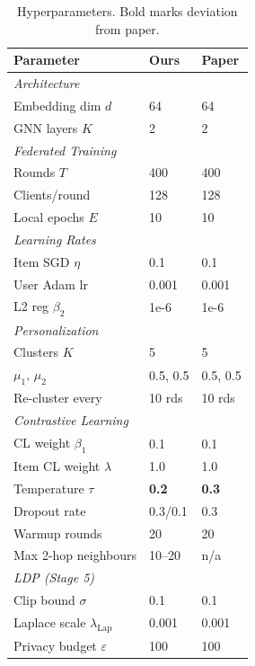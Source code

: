 \documentclass[10pt,twocolumn]{article}
\begin{document}
\begin{table}[H]
\centering
\caption{Hyperparameters. Bold marks deviation from paper.}
\label{tab:hparams}
\setlength{\tabcolsep}{4pt}
\footnotesize
\begin{tabular}{lll}
\toprule
\textbf{Parameter} & \textbf{Ours} & \textbf{Paper} \\
\midrule
\multicolumn{3}{l}{\textit{Architecture}} \\
Embedding dim $d$  & 64    & 64 \\
GNN layers $K$     & 2     & 2 \\
\midrule
\multicolumn{3}{l}{\textit{Federated Training}} \\
Rounds $T$         & 400   & 400 \\
Clients/round      & 128   & 128 \\
Local epochs $E$   & 10    & 10 \\
\midrule
\multicolumn{3}{l}{\textit{Learning Rates}} \\
Item SGD $\eta$    & 0.1   & 0.1 \\
User Adam lr       & 0.001 & 0.001 \\
L2 reg $\beta_2$   & 1e-6  & 1e-6 \\
\midrule
\multicolumn{3}{l}{\textit{Personalization}} \\
Clusters $K$       & 5     & 5 \\
$\mu_1,\,\mu_2$    & 0.5, 0.5 & 0.5, 0.5 \\
Re-cluster every   & 10 rds & 10 rds \\
\midrule
\multicolumn{3}{l}{\textit{Contrastive Learning}} \\
CL weight $\beta_1$        & 0.1  & 0.1 \\
Item CL weight $\lambda$   & 1.0  & 1.0 \\
Temperature $\tau$         & \textbf{0.2} & \textbf{0.3} \\
Dropout rate               & 0.3/0.1 & 0.3 \\
Warmup rounds              & 20   & 20 \\
Max 2-hop neighbours       & 10--20 & n/a \\
\midrule
\multicolumn{3}{l}{\textit{LDP (Stage 5)}} \\
Clip bound $\sigma$        & 0.1   & 0.1 \\
Laplace scale $\lambda_{\mathrm{Lap}}$ & 0.001 & 0.001 \\
Privacy budget $\varepsilon$ & 100 & 100 \\
\bottomrule
\end{tabular}
\end{table}
\end{document}
